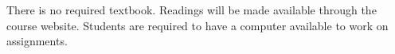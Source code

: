 There is no required textbook. Readings will be made available through the course website. Students are required to have a computer available to work on assignments.
